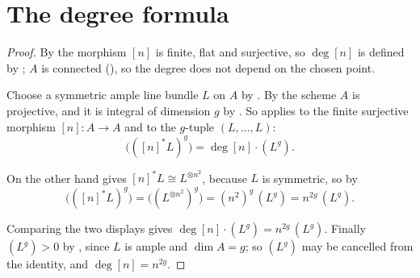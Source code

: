 \section{The degree formula}\label{sec:deg-degree}

\begin{proof}
By  the morphism $[n]$ is finite, flat and surjective, so
$\deg[n]$ is defined by ; $A$ is connected
(), so the degree does not depend on the chosen point.

Choose a symmetric ample line bundle $L$ on $A$ by
.  By  the
scheme $A$ is projective, and it is integral of dimension $g$ by
.  So  applies to the
finite surjective morphism $[n]\colon A\to A$ and to the $g$-tuple
$(L,\dots,L)$:
\[
  \bigl(([n]^*L)^g\bigr)=\deg[n]\cdot(L^g).
\]

On the other hand  gives
$[n]^*L\cong L^{\otimes n^2}$, because $L$ is symmetric, so by
\[
  \bigl(([n]^*L)^g\bigr)=\bigl((L^{\otimes n^2})^g\bigr)
  =(n^2)^g\,(L^g)=n^{2g}\,(L^g).
\]

Comparing the two displays gives $\deg[n]\cdot(L^g)=n^{2g}\,(L^g)$.  Finally
$(L^g)>0$ by , since $L$ is ample and
$\dim A=g$; so $(L^g)$ may be cancelled from the identity, and
$\deg[n]=n^{2g}$.
\end{proof}

